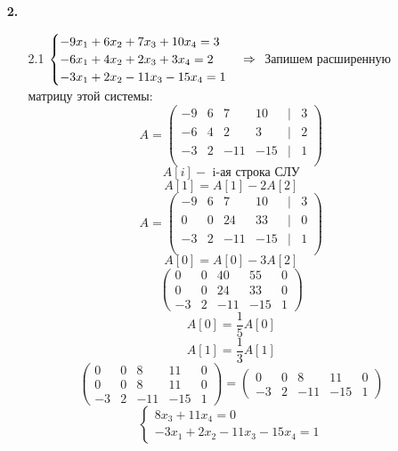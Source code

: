 \documentclass[a4paper]{article}
\renewcommand{\f}[2]{\frac{#1}{#2}}
\renewcommand{\r}{\Rightarrow}
\begin{document}
\begin{enumerate}
    \item[\textbf{2.}]\indent 
    \begin{enumerate}
        \item[2.1]
        $\begin{cases} %
            -9x_1 + 6x_2 + 7x_3 + 10x_4 = 3 \\ -6x_1 + 4x_2 + 2x_3 + 3x_4 = 2 \\ -3x_1 + 2x_2 - 11x_3 - 15x_4 = 1
        \end{cases}\r\\$
        Запишем расширенную матрицу этой системы: \\
        \[A = \begin{pmatrix}
            -9 & 6 & 7 & 10 & | & 3 \\
            -6 & 4 & 2 & 3 & | & 2 \\
            -3 & 2 & -11 & -15 & | & 1 \\
        \end{pmatrix}\]
        \[A[i] - \text{ i-ая строка СЛУ}\]
        \[A[1]=A[1]-2A[2]\]
        \[A = \begin{pmatrix}
            -9 & 6 & 7 & 10 & | & 3 \\
            0 & 0 & 24 & 33 & | & 0 \\
            -3 & 2 & -11 & -15 & | & 1 \\
        \end{pmatrix}\]
        \[A[0]=A[0]-3A[2]\]
        \[\begin{pmatrix}
            0 &  0 & 40 & 55 &  0 \\
            0 &  0 & 24 & 33 &  0 \\
            -3 &  2 & -11 & -15 &  1
        \end{pmatrix}\]
        \[A[0]=\f{1}{5}A[0]\]
        \[A[1]=\f{1}{3}A[1]\]
        \[\begin{pmatrix}
            0 &  0 &  8 & 11 &  0 \\
            0 &  0 &  8 & 11 &  0 \\
            -3 &  2 & -11 & -15 &  1
        \end{pmatrix}=
        \begin{pmatrix}
            0 &  0 &  8 & 11 &  0 \\
            -3 &  2 & -11 & -15 &  1
        \end{pmatrix}\]
        \[\begin{cases}
            8x_3+11x_4=0\\
            -3x_1+2x_2-11x_3-15x_4=1

\end{cases}\]
\end{enumerate}
\end{enumerate}
\end{document}
